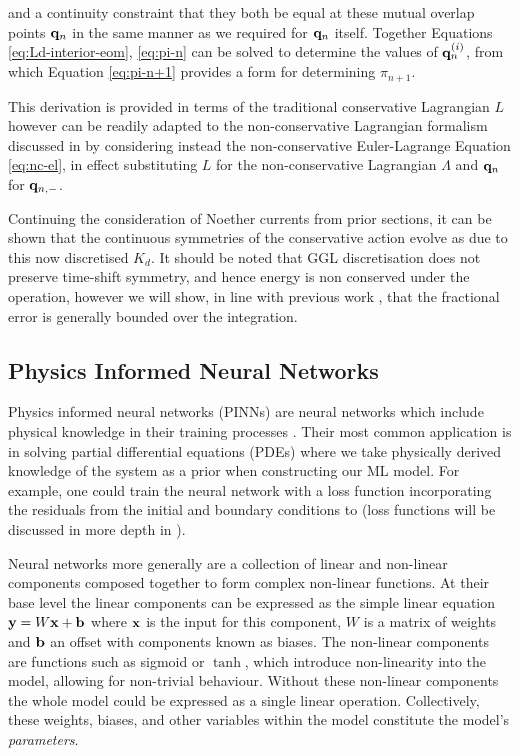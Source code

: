 and a continuity constraint that they both be equal at these mutual overlap points $\vb{q}_n$ in the same manner as we required for $\vb{q}_n$ itself. Together Equations \eqref{eq:Ld-interior-eom}, \eqref{eq:pi-n} can be solved to determine the values of $\vb q^{(i)}_n$, from which Equation \eqref{eq:pi-n+1} provides a form for determining $\pi_{n + 1}$.

This derivation is provided in terms of the traditional conservative Lagrangian $L$ however can be readily adapted to the non-conservative Lagrangian formalism discussed in  by considering instead the non-conservative Euler-Lagrange Equation \eqref{eq:nc-el}, in effect substituting $L$ for the non-conservative Lagrangian $\Lambda$ and $\vb q_n$ for $\vb q_{n, -}$.

Continuing the consideration of Noether currents from prior sections, it can be shown that the continuous symmetries of the conservative action evolve as due to this now discretised $K_d$. It should be noted that GGL discretisation does not preserve time-shift symmetry, and hence energy is non conserved under the operation, however we will show, in line with previous work \cite{tsangSLIMPLECTICINTEGRATORSVARIATIONAL2015}, that the fractional error is generally bounded over the integration.

\subsection{Physics Informed Neural Networks}
\label{sec:intro-pinn}

Physics informed neural networks (PINNs) are neural networks which include physical knowledge in their training processes \cite{raissiPhysicsInformedDeep2017}.
Their most common application is in solving partial differential equations (PDEs) \cite{luDeepXDEDeepLearning2021,mengCompositeNeuralNetwork2020} where we take physically derived knowledge of the system as a prior when constructing our ML model. For example, one could train the neural network with a loss function incorporating the residuals from the initial and boundary conditions to (loss functions will be discussed in more depth in ).

Neural networks more generally are a collection of linear and non-linear components composed together to form complex non-linear functions. At their base level the linear components can be expressed as the simple linear equation \(\vb{y} = W\vb{x} + \vb{b}\) where $\vb x$ is the input for this component, $W$ is a matrix of weights and $\vb{b}$ an offset with components known as biases. The non-linear components are functions such as sigmoid or $\tanh$, which introduce non-linearity into the model, allowing for non-trivial behaviour. Without these non-linear components the whole model could be expressed as a single linear operation. Collectively, these weights, biases, and other variables within the model constitute the model's \emph{parameters}.

